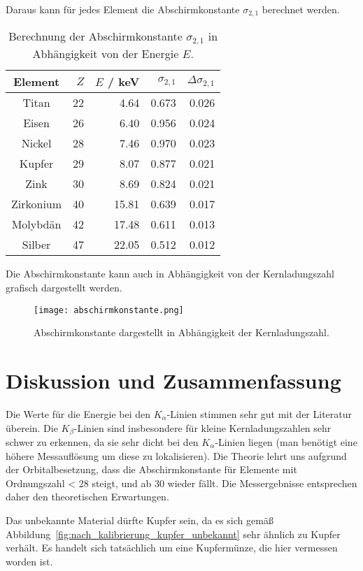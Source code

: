 \documentclass{article}
\begin{document}
Daraus kann für jedes Element die Abschirmkonstante $\sigma_{2,1}$ berechnet werden.


\begin{table}[H]
\caption{Berechnung der Abschirmkonstante $\sigma_{2,1}$ in Abhängigkeit von der Energie $E$.}

\begin{tabular}{c|rrrr}
Element & $Z$ &  $E$ / keV & $\sigma_{2,1}$  & $\Delta\sigma_{2,1}$ \\
\hline
Titan     & 22 &  4.64 & 0.673 & 0.026\\
Eisen     & 26 &  6.40 & 0.956 & 0.024\\
Nickel    & 28 &  7.46 & 0.970 & 0.023\\
Kupfer    & 29 &  8.07 & 0.877 & 0.021\\
Zink      & 30 &  8.69 & 0.824 & 0.021 \\
Zirkonium & 40 &  15.81 & 0.639  & 0.017 \\
Molybdän  & 42 &  17.48 & 0.611 & 0.013\\
Silber    & 47 &  22.05 & 0.512 & 0.012
\end{tabular}
\end{table}

Die Abschirmkonstante kann auch in Abhängigkeit von der Kernladungszahl grafisch dargestellt werden.

\begin{figure}[H]
\texttt{[image: abschirmkonstante.png]}
\caption{Abschirmkonstante dargestellt in Abhängigkeit der Kernladungszahl.}
\label{fig:sigma}
\end{figure}





\section{Diskussion und Zusammenfassung}


Die Werte für die Energie bei den $K_\alpha$-Linien stimmen sehr gut mit der Literatur überein. Die $K_\beta$-Linien sind insbesondere für kleine Kernladungszahlen sehr schwer zu erkennen, da sie sehr dicht bei den $K_\alpha$-Linien liegen (man benötigt eine höhere Messauflösung um diese zu lokalisieren). Die Theorie lehrt uns aufgrund der Orbitalbesetzung, dass die Abschirmkonstante für Elemente mit Ordnungszahl < 28 steigt, und ab 30 wieder fällt. Die Messergebnisse entsprechen daher den theoretischen Erwartungen.


Das unbekannte Material dürfte Kupfer sein, da es sich gemäß Abbildung~\ref{fig:nach_kalibrierung_kupfer_unbekannt} sehr ähnlich zu Kupfer verhält. Es handelt sich tatsächlich um eine Kupfermünze, die hier vermessen worden ist.
\end{document}

